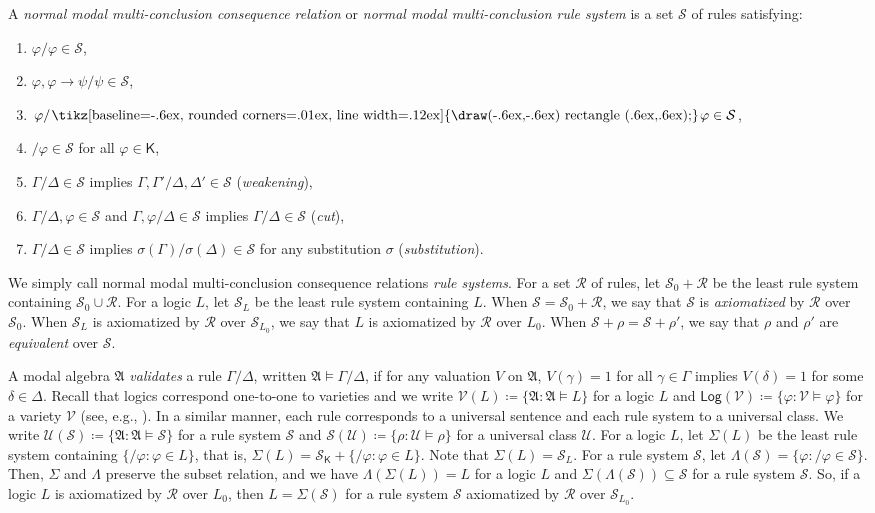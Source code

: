 \documentclass[a4paper,11pt]{article}
\theoremstyle{definition}
\theoremstyle{remark}
\numberwithin{theorem}{section}
\newcommand{\alg}[1]{\mathfrak{#1}}
\newcommand{\A}{\alg{A}}
\newcommand{\class}[1]{\mathcal{#1}}
\newcommand{\V}{\class{V}}
\newcommand{\U}{\class{U}}
\newcommand{\R}{\class{R}}
\renewcommand{\S}{\class{S}}
\newcommand{\Log}{\mathsf{Log}}
\newcommand{\logic}[1]{\mathsf{#1}}
\newcommand{\K}{\logic{K}}
\renewcommand{\phi}{\varphi}
\newcommand{\goodbox}{\hspace{.2ex}\text{%
  \tikz[baseline=-.6ex, rounded corners=.01ex, line width=.12ex]
    {\draw(-.6ex,-.6ex) rectangle (.6ex,.6ex);}}\kern.2ex}
\renewcommand{\Box}{\goodbox}
\renewcommand{\S}{\mathcal{S}}
\begin{document}
A \emph{normal modal multi-conclusion consequence relation} or \emph{normal modal multi-conclusion rule system} is a set $\S$ of rules satisfying:
    \begin{enumerate}
        \item $\phi/\phi \in \S$,
        \item $\phi, \phi \to \psi / \psi \in \S$,
        \item $\phi / \Box \phi \in \S$,
        \item $/\phi \in \S$ for all $\phi \in \K$,
        \item $\Gamma/\Delta \in \S$ implies $\Gamma, \Gamma' / \Delta, \Delta' \in \S$ \quad (\emph{weakening}),
        \item $\Gamma/\Delta, \phi \in \S$ and $\Gamma, \phi/\Delta \in \S$ implies $\Gamma/ \Delta \in \S$ \quad (\emph{cut}),
        \item $\Gamma/\Delta \in \S$ implies $\sigma(\Gamma)/\sigma(\Delta) \in \S$ for any substitution $\sigma$ \quad (\emph{substitution}).
    \end{enumerate}
We simply call normal modal multi-conclusion consequence relations \emph{rule systems}. For a set $\R$ of rules, let $\S_0 + \R$ be the least rule system containing $\S_0 \cup \R$. For a logic $L$, let $\S_L$ be the least rule system containing $L$. When $\S = \S_0 + \R$, we say that $\S$ is \emph{axiomatized} by $\R$ over $\S_0$. When $\S_L$ is axiomatized by $\R$ over $\S_{L_0}$, we say that $L$ is axiomatized by $\R$ over $L_0$. When $\S + \rho = \S + \rho'$, we say that $\rho$ and $\rho'$ are \emph{equivalent} over $\S$. 

A modal algebra $\A$ \emph{validates} a rule $\Gamma/\Delta$, written $\A \models \Gamma/\Delta$, if for any valuation $V$ on $\A$, $V(\gamma) = 1$ for all $\gamma \in \Gamma$ implies $V(\delta) = 1$ for some $\delta \in \Delta$. Recall that logics correspond one-to-one to varieties and we write $\V(L) \coloneq \{\A: \A \models L\}$ for a logic $L$ and $\Log(\V) \coloneq \{\phi: \V \models \phi\}$ for a variety $\V$ (see, e.g., \cite[Section 7.6]{czModalLogic1997}). In a similar manner, each rule corresponds to a universal sentence and each rule system to a universal class. We write $\U(\S) \coloneq \{\A: \A \models \S\}$ for a rule system $\S$ and $\S(\U) \coloneq \{\rho: \U \models \rho\}$ for a universal class $\U$. For a logic $L$, let $\Sigma(L)$ be the least rule system containing $\{/\phi: \phi \in L\}$, that is, $\Sigma(L) = \S_\K + \{/\phi: \phi \in L\}$. Note that $\Sigma(L) = \S_L$. For a rule system $\S$, let $\Lambda(\S) = \{\phi: /\phi \in \S\}$. Then, $\Sigma$ and $\Lambda$ preserve the subset relation, and we have $\Lambda(\Sigma(L)) = L$ for a logic $L$ and $\Sigma(\Lambda(\S)) \subseteq \S$ for a rule system $\S$. So, if a logic $L$ is axiomatized by $\R$ over $L_0$, then $L = \Sigma(\S)$ for a rule system $\S$ axiomatized by $\R$ over $\S_{L_0}$.
\end{document}
